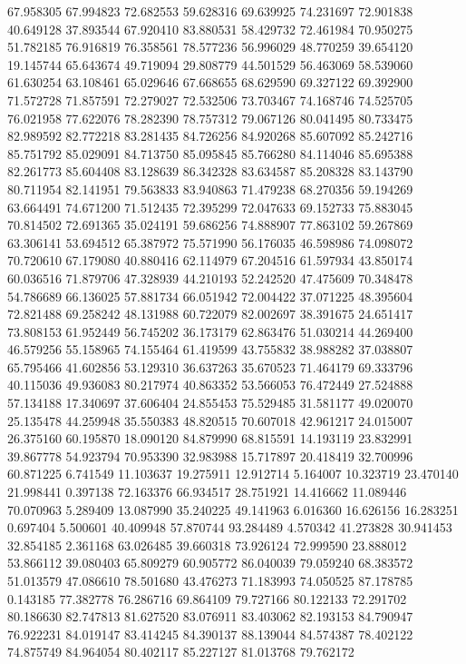 67.958305
67.994823
72.682553
59.628316
69.639925
74.231697
72.901838
40.649128
37.893544
67.920410
83.880531
58.429732
72.461984
70.950275
51.782185
76.916819
76.358561
78.577236
56.996029
48.770259
39.654120
19.145744
65.643674
49.719094
29.808779
44.501529
56.463069
58.539060
61.630254
63.108461
65.029646
67.668655
68.629590
69.327122
69.392900
71.572728
71.857591
72.279027
72.532506
73.703467
74.168746
74.525705
76.021958
77.622076
78.282390
78.757312
79.067126
80.041495
80.733475
82.989592
82.772218
83.281435
84.726256
84.920268
85.607092
85.242716
85.751792
85.029091
84.713750
85.095845
85.766280
84.114046
85.695388
82.261773
85.604408
83.128639
86.342328
83.634587
85.208328
83.143790
80.711954
82.141951
79.563833
83.940863
71.479238
68.270356
59.194269
63.664491
74.671200
71.512435
72.395299
72.047633
69.152733
75.883045
70.814502
72.691365
35.024191
59.686256
74.888907
77.863102
59.267869
63.306141
53.694512
65.387972
75.571990
56.176035
46.598986
74.098072
70.720610
67.179080
40.880416
62.114979
67.204516
61.597934
43.850174
60.036516
71.879706
47.328939
44.210193
52.242520
47.475609
70.348478
54.786689
66.136025
57.881734
66.051942
72.004422
37.071225
48.395604
72.821488
69.258242
48.131988
60.722079
82.002697
38.391675
24.651417
73.808153
61.952449
56.745202
36.173179
62.863476
51.030214
44.269400
46.579256
55.158965
74.155464
61.419599
43.755832
38.988282
37.038807
65.795466
41.602856
53.129310
36.637263
35.670523
71.464179
69.333796
40.115036
49.936083
80.217974
40.863352
53.566053
76.472449
27.524888
57.134188
17.340697
37.606404
24.855453
75.529485
31.581177
49.020070
25.135478
44.259948
35.550383
48.820515
70.607018
42.961217
24.015007
26.375160
60.195870
18.090120
84.879990
68.815591
14.193119
23.832991
39.867778
54.923794
70.953390
32.983988
15.717897
20.418419
32.700996
60.871225
6.741549
11.103637
19.275911
12.912714
5.164007
10.323719
23.470140
21.998441
0.397138
72.163376
66.934517
28.751921
14.416662
11.089446
70.070963
5.289409
13.087990
35.240225
49.141963
6.016360
16.626156
16.283251
0.697404
5.500601
40.409948
57.870744
93.284489
4.570342
41.273828
30.941453
32.854185
2.361168
63.026485
39.660318
73.926124
72.999590
23.888012
53.866112
39.080403
65.809279
60.905772
86.040039
79.059240
68.383572
51.013579
47.086610
78.501680
43.476273
71.183993
74.050525
87.178785
0.143185
77.382778
76.286716
69.864109
79.727166
80.122133
72.291702
80.186630
82.747813
81.627520
83.076911
83.403062
82.193153
84.790947
76.922231
84.019147
83.414245
84.390137
88.139044
84.574387
78.402122
74.875749
84.964054
80.402117
85.227127
81.013768
79.762172
